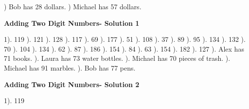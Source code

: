 \documentclass{article}%
\begin{document}
) Bob has 28 dollars.%
) Michael has 57 dollars.%
\newline%
\newpage%
\large%
\begin{center}%
\textbf{Adding Two Digit Numbers- Solution 1}%
\newline%
\end{center} \normalsize%
1). 119%
). 121%
). 128%
). 117%
). 69%
). 177%
). 51%
). 108%
). 37%
). 89%
). 95%
). 134%
). 132%
). 70%
). 104%
). 134%
). 62%
). 87%
). 186%
). 154%
). 84%
). 63%
). 154%
). 182%
). 127%
). Alex has 71 books.%
). Laura has 73 water bottles.%
). Michael has 70 pieces of trash.%
). Michael has 91 marbles.%
). Bob has 77 pens.%
\newline%
\newpage%
\large%
\begin{center}%
\textbf{Adding Two Digit Numbers- Solution 2}%
\newline%
\end{center} \normalsize%
1). 119%
\newline%
\end{document}
